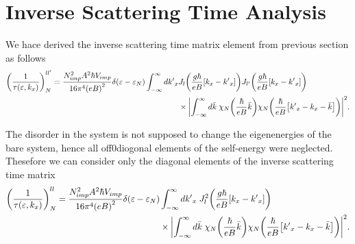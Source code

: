 \section{Inverse Scattering Time Analysis}

We hace derived the inverse scattering time matrix element from previous section as follows
\begin{equation} \label{5.1}
  \begin{aligned}
    \qty(\frac{1}{\tau(\varepsilon,k_x)})^{ll'}_{N} =
    \frac { N_{imp}^2 A^2 \hbar V_{imp}}{16\pi^4 \qty(eB)^2}
    \delta(\varepsilon - \varepsilon_{N})
    \int_{-\infty}^{\infty} d {k'}_x
    &
    J_l\qty(\frac{g\hbar}{eB}[{k}_x - {k'}_x])
    J_{l'}\qty(\frac{g\hbar}{eB}[{k}_x - {k'}_x]) \\
    & \times
    \qty|
    \int_{-\infty}^{\infty} d\bar{k} \;
    {\chi}_{N}\qty(\frac{\hbar}{eB}\bar{k})
    {\chi}_{N}\qty(\frac{\hbar}{eB} \qty[{k'}_x - {k}_x - \bar{k}])|^2.
  \end{aligned}
\end{equation}

\noindent
The disorder in the system is not supposed to change the eigenenergies of the bare system, hence all off0diogonal elements of the self-energy were neglected. Thesefore we can consider only the diagonal elements of the inverse scattering time matrix
\begin{equation} \label{5.2}
  \begin{aligned}
    \qty(\frac{1}{\tau(\varepsilon,k_x)})^{ll}_{N} =
    \frac { N_{imp}^2 A^2 \hbar V_{imp}}{16\pi^4 \qty(eB)^2}
    \delta(\varepsilon - \varepsilon_{N}) &
    \int_{-\infty}^{\infty} d {k'}_x \;
    J_l^2\qty(\frac{g\hbar}{eB}[{k}_x - {k'}_x])
    \\
    & \times
    \qty|
    \int_{-\infty}^{\infty} d\bar{k} \;
    {\chi}_{N}\qty(\frac{\hbar}{eB}\bar{k})
    {\chi}_{N}\qty(\frac{\hbar}{eB} \qty[{k'}_x - {k}_x - \bar{k}])|^2.
  \end{aligned}
\end{equation}

